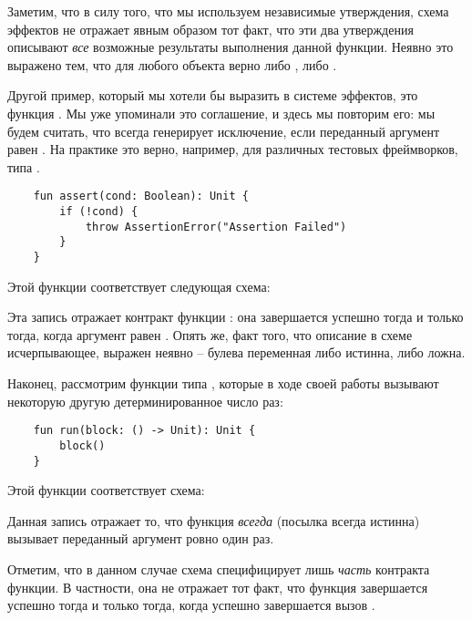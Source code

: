 Заметим, что в силу того, что мы используем независимые утверждения, схема эффектов не отражает явным образом тот факт, что эти два утверждения описывают \emph{все} возможные результаты выполнения данной функции. Неявно это выражено тем, что для любого объекта  верно либо , либо . 


\bigskip


Другой пример, который мы хотели бы выразить в системе эффектов, это функция . Мы уже упоминали это соглашение, и здесь мы повторим его: мы будем считать, что  всегда генерирует исключение, если переданный аргумент равен . На практике это верно, например, для различных тестовых фреймворков, типа .

\begin{verbatim}
    fun assert(cond: Boolean): Unit {
        if (!cond) {
            throw AssertionError("Assertion Failed")
        }
    }
\end{verbatim}

Этой функции соответствует следующая схема:

{}

Эта запись отражает контракт функции : она завершается успешно тогда и только тогда, когда аргумент равен . Опять же, факт того, что описание в схеме исчерпывающее, выражен неявно -- булева переменная либо истинна, либо ложна.


\bigskip


Наконец, рассмотрим функции типа , которые в ходе своей работы вызывают некоторую другую детерминированное число раз:

\begin{verbatim}
    fun run(block: () -> Unit): Unit {
        block()
    }
\end{verbatim}

Этой функции соответствует схема:

{}

Данная запись отражает то, что функция  \emph{всегда} (посылка  всегда истинна) вызывает переданный аргумент  ровно один раз.

Отметим, что в данном случае схема специфицирует лишь \emph{часть} контракта функции. В частности, она не отражает тот факт, что функция завершается успешно тогда и только тогда, когда успешно завершается вызов .









